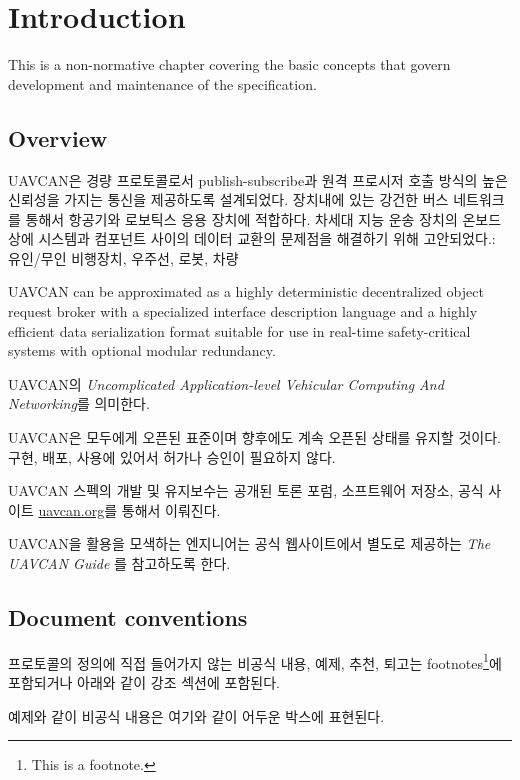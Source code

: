 \chapter{Introduction}\label{sec:introduction}

This is a non-normative chapter covering the basic concepts that govern development and maintenance of
the specification.

\section{Overview}

UAVCAN은 경량 프로토콜로서 publish-subscribe과 원격 프로시저 호출 방식의 높은 신뢰성을 가지는 통신을 제공하도록 설계되었다. 장치내에 있는 강건한 버스 네트워크를 통해서 항공기와 로보틱스 응용 장치에 적합하다.
차세대 지능 운송 장치의 온보드 상에 시스템과 컴포넌트 사이의 데이터 교환의 문제점을 해결하기 위해 고안되었다.: 유인/무인 비행장치, 우주선, 로봇, 차량


UAVCAN can be approximated as a highly deterministic decentralized object request broker
with a specialized interface description language and a highly efficient data serialization format
suitable for use in real-time safety-critical systems with optional modular redundancy.

UAVCAN의 \emph{Uncomplicated Application-level Vehicular Computing And Networking}를 의미한다.

UAVCAN은 모두에게 오픈된 표준이며 향후에도 계속 오픈된 상태를 유지할 것이다.
구현, 배포, 사용에 있어서 허가나 승인이 필요하지 않다.

UAVCAN 스펙의 개발 및 유지보수는 공개된 토론 포럼, 소프트웨어 저장소, 공식 사이트 \href{http://uavcan.org}{uavcan.org}를 통해서 이뤄진다.

UAVCAN을 활용을 모색하는 엔지니어는 공식 웹사이트에서 별도로 제공하는 \emph{The UAVCAN Guide} 를 참고하도록 한다.

\section{Document conventions}

프로토콜의 정의에 직접 들어가지 않는 비공식 내용, 예제, 추천, 퇴고는 footnotes\footnote{This is a footnote.}에 포함되거나 아래와 같이 강조 섹션에 포함된다.

\begin{remark}
    예제와 같이 비공식 내용은 여기와 같이 어두운 박스에 표현된다.
\end{remark}

